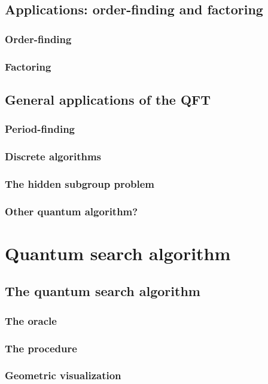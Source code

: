 \documentclass{book}
\theoremstyle{definition}
\begin{document}
\subsection{Applications: order-finding and factoring}
\subsubsection{Order-finding}
\subsubsection{Factoring}
\subsection{General applications of the QFT}
\subsubsection{Period-finding}
\subsubsection{Discrete algorithms}
\subsubsection{The hidden subgroup problem}
\subsubsection{Other quantum algorithm?}

\newpage



\section{Quantum search algorithm}

\subsection{The quantum search algorithm}
\subsubsection{The oracle}
\subsubsection{The procedure}
\subsubsection{Geometric visualization}
\end{document}
